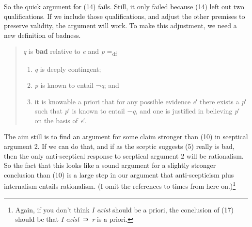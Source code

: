 \documentclass[
  11pt,
  letterpaper,
  DIV=11,
  numbers=noendperiod,
  twoside]{scrartcl}
\providecommand{\tightlist}{%
  \setlength{\itemsep}{0pt}\setlength{\parskip}{0pt}}
\begin{document}
So the quick argument for (14) fails. Still, it only failed because (14)
left out two qualifications. If we include those qualifications, and
adjust the other premises to preserve validity, the argument will work.
To make this adjustment, we need a new definition of badness.

\begin{quote}
\emph{q} is \textbf{bad} relative to \emph{e} and \emph{p}
=\textsubscript{df}

\begin{enumerate}
\def\labelenumi{\arabic{enumi}.}
\tightlist
\item
  \emph{q} is deeply contingent;
\item
  \emph{p} is known to entail ¬\emph{q}; and
\item
  it is knowable a priori that for any possible evidence \emph{e}′ there
  exists a \emph{p}′ such that \emph{p}′ is known to entail ¬\emph{q},
  and one is justified in believing \emph{p}′ on the basis of \emph{e}′.
\end{enumerate}
\end{quote}

The aim still is to find an argument for some claim stronger than (10)
in sceptical argument 2. If we can do that, and if as the sceptic
suggests (5) really is bad, then the only anti-sceptical response to
sceptical argument 2 will be rationalism. So the fact that this looks
like a sound argument for a slightly stronger conclusion than (10) is a
large step in our argument that anti-scepticism plus internalism entails
rationalism. (I omit the references to times from here on.)\footnote{Again,
  if you don't think \emph{I exist} should be a priori, the conclusion
  of (17) should be that \emph{I exist}~⊃~\emph{r} is a priori.}
\end{document}

